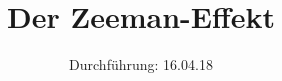 

\subject{V27}
\title{Der Zeeman-Effekt}
\date{
  Durchführung: 16.04.18
  \hspace{3em}
}



\maketitle
\thispagestyle{empty}
\tableofcontents
\newpage



%




\printbibliography


